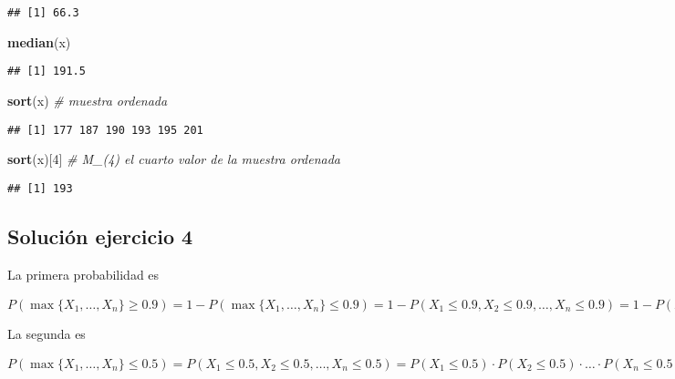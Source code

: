 \documentclass[
]{article}
\newenvironment{Shaded}{\begin{snugshade}}{\end{snugshade}}
\newcommand{\CommentTok}[1]{\textcolor[rgb]{0.56,0.35,0.01}{\textit{#1}}}
\newcommand{\DecValTok}[1]{\textcolor[rgb]{0.00,0.00,0.81}{#1}}
\newcommand{\KeywordTok}[1]{\textcolor[rgb]{0.13,0.29,0.53}{\textbf{#1}}}
\newcommand{\NormalTok}[1]{#1}
\begin{document}
\begin{verbatim}
## [1] 66.3
\end{verbatim}

\begin{Shaded}
\begin{Highlighting}[]
\KeywordTok{median}\NormalTok{(x)}
\end{Highlighting}
\end{Shaded}

\begin{verbatim}
## [1] 191.5
\end{verbatim}

\begin{Shaded}
\begin{Highlighting}[]
\KeywordTok{sort}\NormalTok{(x) }\CommentTok{\# muestra ordenada}
\end{Highlighting}
\end{Shaded}

\begin{verbatim}
## [1] 177 187 190 193 195 201
\end{verbatim}

\begin{Shaded}
\begin{Highlighting}[]
\KeywordTok{sort}\NormalTok{(x)[}\DecValTok{4}\NormalTok{] }\CommentTok{\# M\_(4) el cuarto valor de la muestra ordenada}
\end{Highlighting}
\end{Shaded}

\begin{verbatim}
## [1] 193
\end{verbatim}

\hypertarget{soluciuxf3n-ejercicio-4}{%
\subsection{Solución ejercicio 4}\label{soluciuxf3n-ejercicio-4}}

La primera probabilidad es

\(P(\max\{X_1,\ldots,X_n\}\geq 0.9)=1-P(\max\{X_1,\ldots,X_n\}\leq 0.9)=1-P(X_1\leq 0.9,X_2\leq 0.9,\ldots, X_n\leq 0.9)=1-P(X_1\leq 0.9)\cdot P(X_2\leq 0.9)\cdot\ldots\cdot P(X_n\leq 0.9)=1-0.9^10= 0.6513.\)

La segunda es

\(P(\max\{X_1,\ldots,X_n\}\leq 0.5)=P(X_1\leq 0.5,X_2\leq 0.5,\ldots, X_n\leq 0.5)=P(X_1\leq 0.5)\cdot P(X_2\leq 0.5)\cdot\ldots\cdot P(X_n\leq 0.5)=0.5^{10}= \ensuremath{9.765625\times 10^{-4}}.\)
\end{document}
